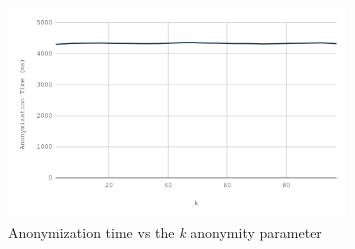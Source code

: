 \begin{figure}[ht]
    \centering
    \includegraphics[width=0.8\textwidth]{images/anon-k.png}
    \caption{Anonymization  time vs the \emph{k} anonymity parameter}\label{fig:anon_k}
\end{figure}